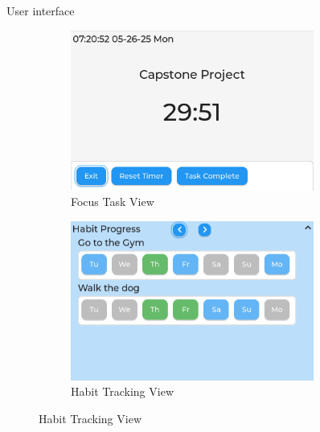 \documentclass[final]{beamer}
\newlength{\sepwidth}
\newlength{\colwidth}
\newcommand{\separatorcolumn}{\begin{column}{\sepwidth}\end{column}}
\begin{document}
\begin{frame}[t]
\begin{columns}[t]
\begin{column}{\colwidth}
\begin{block}{User interface}
\begin{figure}
\begin{subfigure}{0.49\textwidth}
            \includegraphics[width=\textwidth]{focusTile.png}
            \caption{Focus Task View}
          \end{subfigure}
          \hfill
          \begin{subfigure}{0.49\textwidth}
            \includegraphics[width=\textwidth]{habitTile.png}
            \caption{Habit Tracking View}
          \end{subfigure}
        \end{figure} 

      \end{block}

    \end{column}

    \separatorcolumn

    \begin{column}{\colwidth} 


\end{column}
\end{columns}
\end{frame}
\end{document}
